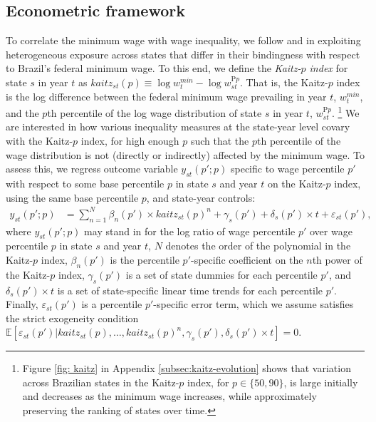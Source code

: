 \subsection{Econometric framework\label{subsec:Spillover-effects-identified}}

To correlate the minimum wage with wage inequality, we follow \citet{Lee1999} and \citet{Autor2016} in exploiting heterogeneous exposure across states that differ in their bindingness with respect to Brazil's federal minimum wage. To this end, we define the \emph{Kaitz-$p$ index} for state $s$ in year $t$ as $kaitz_{st}(p) \equiv \log w_{t}^{min} - \log w_{st}^{\text{P}p}$. That is, the Kaitz-$p$ index is the log difference between the federal minimum wage prevailing in year $t$, $w_{t}^{min}$, and the $p$th percentile of the log wage distribution of state $s$ in year $t$, $w_{st}^{\text{P}p}$.%
%
\footnote{Figure \ref{fig: kaitz} in Appendix \ref{subsec:kaitz-evolution} shows that variation across Brazilian states in the Kaitz-$p$ index, for $p \in \{ 50, 90 \}$, is large initially and decreases as the minimum wage increases, while approximately preserving the ranking of states over time.} %
%
We are interested in how various inequality measures at the state-year level covary with the Kaitz-$p$ index, for high enough $p$ such that the $p$th percentile of the wage distribution is not (directly or indirectly) affected by the minimum wage. To assess this, we regress outcome variable $y_{st}(p';p)$ specific to wage percentile $p'$ with respect to some base percentile $p$ in state $s$ and year $t$ on the Kaitz-$p$ index, using the same base percentile $p$, and state-year controls:
%
\begin{align}
  y_{st}(p';p) &= \sum_{n=1}^{N} \beta_{n}(p') \times kaitz_{st}(p)^{n} + \gamma_{s}(p') + \delta_{s}(p') \times t + \varepsilon_{st}(p'),\label{eq:Lee}
\end{align}
%
where $y_{st}(p';p)$ may stand in for the log ratio of wage percentile $p'$ over wage percentile $p$ in state $s$ and year $t$, $N$ denotes the order of the polynomial in the Kaitz-$p$ index, $\beta_{n}(p')$ is the percentile $p'$-specific coefficient on the $n$th power of the Kaitz-$p$ index, $\gamma_{s}(p')$ is a set of state dummies for each percentile $p'$, and $\delta_{s}(p') \times t$ is a set of state-specific linear time trends for each percentile $p'$. Finally, $\varepsilon_{st}(p')$ is a percentile $p'$-specific error term, which we assume satisfies the strict exogeneity condition $\mathbb{E}[\varepsilon_{st}(p')|kaitz_{st}(p),\ldots,kaitz_{st}(p)^{n},\gamma_{s}(p'), \delta_{s}(p') \times t]=0$.


